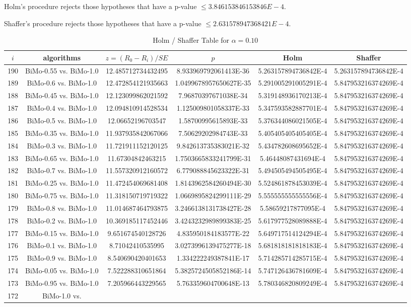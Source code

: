 \documentclass[a4paper,10pt]{article}
\begin{document}
\begin{landscape}
Holm's procedure rejects those hypotheses that have a p-value $\le3.846153846153846E-4$.


Shaffer's procedure rejects those hypotheses that have a p-value $\le2.631578947368421E-4$.


\begin{table}[!htp]
\centering\tiny
\caption{Holm / Shaffer Table for $\alpha=0.10$}
\begin{tabular}{cccccc}
$i$&algorithms&$z=(R_0 - R_i)/SE$&$p$&Holm&Shaffer\\
\hline
190&BiMo-0.55 vs. BiMo-1.0&12.485712734432495&8.933969792061413E-36&5.263157894736842E-4&5.263157894736842E-4\\189&BiMo-0.6 vs. BiMo-1.0&12.472854121935663&1.0499678957650627E-35&5.291005291005291E-4&5.847953216374269E-4\\188&BiMo-0.45 vs. BiMo-1.0&12.123099862021592&7.96870397671038E-34&5.319148936170213E-4&5.847953216374269E-4\\187&BiMo-0.4 vs. BiMo-1.0&12.094810914528534&1.125009801058337E-33&5.347593582887701E-4&5.847953216374269E-4\\186&BiMo-0.5 vs. BiMo-1.0&12.06652196703547&1.58700995615893E-33&5.376344086021505E-4&5.847953216374269E-4\\185&BiMo-0.35 vs. BiMo-1.0&11.937935842067066&7.50629202984743E-33&5.405405405405405E-4&5.847953216374269E-4\\184&BiMo-0.3 vs. BiMo-1.0&11.721911152120125&9.842613735383021E-32&5.434782608695652E-4&5.847953216374269E-4\\183&BiMo-0.65 vs. BiMo-1.0&11.67304842463215&1.7503665833241799E-31&5.46448087431694E-4&5.847953216374269E-4\\182&BiMo-0.7 vs. BiMo-1.0&11.557320912160572&6.779088845623322E-31&5.494505494505495E-4&5.847953216374269E-4\\181&BiMo-0.25 vs. BiMo-1.0&11.472454069681408&1.8143962584260494E-30&5.524861878453039E-4&5.847953216374269E-4\\180&BiMo-0.75 vs. BiMo-1.0&11.318150719719322&1.0669895824299111E-29&5.555555555555556E-4&5.847953216374269E-4\\179&BiMo-0.8 vs. BiMo-1.0&11.014687464793875&3.2466138131738427E-28&5.58659217877095E-4&5.847953216374269E-4\\178&BiMo-0.2 vs. BiMo-1.0&10.369185117452446&3.4243232989899383E-25&5.617977528089888E-4&5.847953216374269E-4\\177&BiMo-0.15 vs. BiMo-1.0&9.651674540128726&4.835950184183577E-22&5.649717514124294E-4&5.847953216374269E-4\\176&BiMo-0.1 vs. BiMo-1.0&8.71042410535995&3.0273996139475277E-18&5.681818181818183E-4&5.847953216374269E-4\\175&BiMo-0.9 vs. BiMo-1.0&8.540690420401653&1.334222249387841E-17&5.714285714285715E-4&5.847953216374269E-4\\174&BiMo-0.05 vs. BiMo-1.0&7.522288310651864&5.3825724505852186E-14&5.747126436781609E-4&5.847953216374269E-4\\173&BiMo-0.95 vs. BiMo-1.0&7.205966443229565&5.763359604700648E-13&5.780346820809249E-4&5.847953216374269E-4\\172&BiMo-1.0 vs. 
\end{tabular}
\end{table}
\end{landscape}
\end{document}

